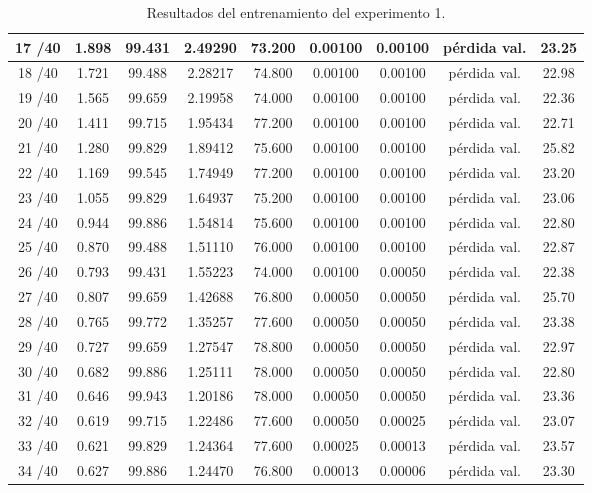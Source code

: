 \begin{table}[H]
\begin{tabular}{|c|c|c|c|c|c|c|c|c|}
        17 /40 & 1.898  & 99.431 & 2.49290 & 73.200 & 0.00100 & 0.00100 & pérdida val. & 23.25  \\ \hline
        18 /40 & 1.721  & 99.488 & 2.28217 & 74.800 & 0.00100 & 0.00100 & pérdida val. & 22.98  \\ \hline
        19 /40 & 1.565  & 99.659 & 2.19958 & 74.000 & 0.00100 & 0.00100 & pérdida val. & 22.36  \\ \hline
        20 /40 & 1.411  & 99.715 & 1.95434 & 77.200 & 0.00100 & 0.00100 & pérdida val. & 22.71  \\ \hline
        21 /40 & 1.280  & 99.829 & 1.89412 & 75.600 & 0.00100 & 0.00100 & pérdida val. & 25.82  \\ \hline
        22 /40 & 1.169  & 99.545 & 1.74949 & 77.200 & 0.00100 & 0.00100 & pérdida val. & 23.20  \\ \hline
        23 /40 & 1.055  & 99.829 & 1.64937 & 75.200 & 0.00100 & 0.00100 & pérdida val. & 23.06  \\ \hline
        24 /40 & 0.944  & 99.886 & 1.54814 & 75.600 & 0.00100 & 0.00100 & pérdida val. & 22.80  \\ \hline
        25 /40 & 0.870  & 99.488 & 1.51110 & 76.000 & 0.00100 & 0.00100 & pérdida val. & 22.87  \\ \hline
        26 /40 & 0.793  & 99.431 & 1.55223 & 74.000 & 0.00100 & 0.00050 & pérdida val. & 22.38  \\ \hline
        27 /40 & 0.807  & 99.659 & 1.42688 & 76.800 & 0.00050 & 0.00050 & pérdida val. & 25.70  \\ \hline
        28 /40 & 0.765  & 99.772 & 1.35257 & 77.600 & 0.00050 & 0.00050 & pérdida val. & 23.38  \\ \hline
        29 /40 & 0.727  & 99.659 & 1.27547 & 78.800 & 0.00050 & 0.00050 & pérdida val. & 22.97  \\ \hline
        30 /40 & 0.682  & 99.886 & 1.25111 & 78.000 & 0.00050 & 0.00050 & pérdida val. & 22.80  \\ \hline
        31 /40 & 0.646  & 99.943 & 1.20186 & 78.000 & 0.00050 & 0.00050 & pérdida val. & 23.36  \\ \hline
        32 /40 & 0.619  & 99.715 & 1.22486 & 77.600 & 0.00050 & 0.00025 & pérdida val. & 23.07  \\ \hline
        33 /40 & 0.621  & 99.829 & 1.24364 & 77.600 & 0.00025 & 0.00013 & pérdida val. & 23.57  \\ \hline
        34 /40 & 0.627  & 99.886 & 1.24470 & 76.800 & 0.00013 & 0.00006 & pérdida val. & 23.30  \\ \hline
        \end{tabular}
        \caption{Resultados del entrenamiento del experimento 1.}
        \label{tab:training_results_b1}
        \end{table}

